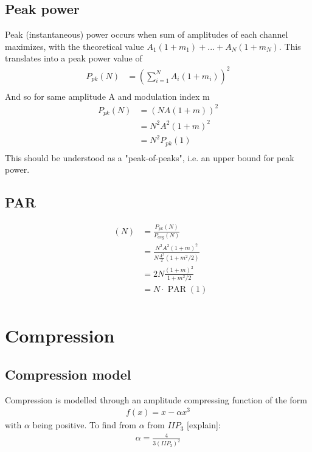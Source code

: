 \documentclass[12pt]{article}
\DeclareMathOperator{\PAR}{PAR}
\DeclareMathOperator{\PARMAX}{PAR_{MAX}}
\begin{document}
\subsection{Peak power}

Peak (instantaneous) power occurs when sum of amplitudes of each channel maximizes, with the theoretical value $A_1(1+m_1) + ... + A_N(1+m_N)$. This translates into a peak power value of
\begin{equation}
\begin{aligned}
P_{pk}(N) & = ( \sum_{i=1}^{N}  A_i ( 1 + m_i ) )^2 \\
\end{aligned}
\end{equation}
And so for same amplitude A and modulation index m
\begin{equation}
\begin{aligned}
P_{pk}(N) & = ( N A (1 + m) )^2 \\
       & = N^2 A^2 (1 + m)^2 \\
       & = N^2 P_{pk}(1) \\
\end{aligned}
\end{equation}
This should be understood as a "peak-of-peaks", i.e. an upper bound for peak power. 

\subsection{PAR}

\begin{equation}
\begin{aligned}
\PARMAX(N)  & =  \frac{P_{pk}(N)}{P_{avg}(N)} \\
        & =  \frac{N^2 A^2 ( 1 + m )^2 }{N \frac{A^2}{2}  ( 1 + m^2 / 2)} \\
        & =  2 N \frac{( 1 + m )^2 }{ 1 + m^2 / 2} \\
        & =  N \cdot \PAR(1) \\
\end{aligned}
\end{equation}


\section{Compression}

\subsection{Compression model}
Compression is modelled through an amplitude compressing function of the form
\begin{equation}
\begin{aligned}
f\left(x\right)=x-\alpha x^3
\end{aligned}
\end{equation}
with $\alpha$ being positive.
To find from $\alpha$ from $IIP_3$ [explain]:
\begin{equation}
\begin{aligned}
\alpha = \frac{4}{3\left(IIP_3\right)^2}
\end{aligned}
\end{equation}
\end{document}
